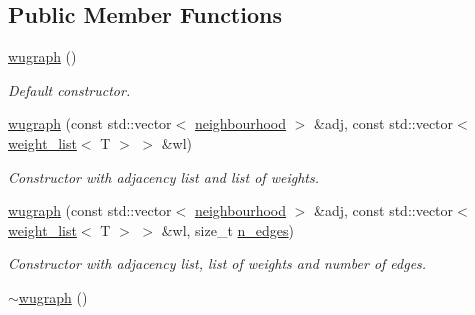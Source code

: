 \subsection*{Public Member Functions}
\begin{DoxyCompactItemize}
\item 
\hypertarget{classlgraph_1_1wugraph_a3621c2f013cbd5cd4984380aa2aeb842}{\hyperlink{classlgraph_1_1wugraph_a3621c2f013cbd5cd4984380aa2aeb842}{wugraph} ()}\label{classlgraph_1_1wugraph_a3621c2f013cbd5cd4984380aa2aeb842}

\begin{DoxyCompactList}\small\item\em Default constructor. \end{DoxyCompactList}\item 
\hyperlink{classlgraph_1_1wugraph_a489f406928d9e982c7fa5b0a3cea53f5}{wugraph} (const std\-::vector$<$ \hyperlink{namespacelgraph_a052e7766c13f3a43cec0aec8173fdede}{neighbourhood} $>$ \&adj, const std\-::vector$<$ \hyperlink{namespacelgraph_a1e0fd5ef0a78b2a92da48adbed265cb6}{weight\-\_\-list}$<$ T $>$ $>$ \&wl)
\begin{DoxyCompactList}\small\item\em Constructor with adjacency list and list of weights. \end{DoxyCompactList}\item 
\hyperlink{classlgraph_1_1wugraph_a958ee0cc05df616aacb077e2effffcf9}{wugraph} (const std\-::vector$<$ \hyperlink{namespacelgraph_a052e7766c13f3a43cec0aec8173fdede}{neighbourhood} $>$ \&adj, const std\-::vector$<$ \hyperlink{namespacelgraph_a1e0fd5ef0a78b2a92da48adbed265cb6}{weight\-\_\-list}$<$ T $>$ $>$ \&wl, size\-\_\-t \hyperlink{classlgraph_1_1xxgraph_a8ca991d1521cb6ba77e1cd3494ab42be}{n\-\_\-edges})
\begin{DoxyCompactList}\small\item\em Constructor with adjacency list, list of weights and number of edges. \end{DoxyCompactList}\item 
\hypertarget{classlgraph_1_1wugraph_abd755d0367bda13250fcccadd1079964}{\hyperlink{classlgraph_1_1wugraph_abd755d0367bda13250fcccadd1079964}{$\sim$wugraph} ()}\label{classlgraph_1_1wugraph_abd755d0367bda13250fcccadd1079964}


\end{DoxyCompactItemize}
